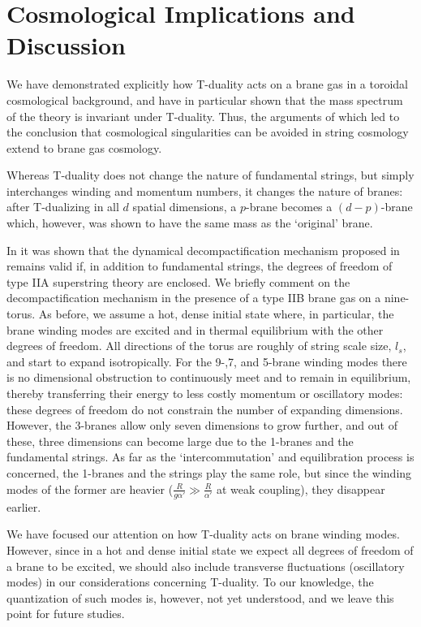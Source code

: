 \documentclass[a4paper,twocolumn,nofootinbib,tightenlines,prd,aps,
               superscriptaddress]{revtex4} %
\newcommand{\al}{\alpha}
\begin{document}
\section{Cosmological Implications and Discussion}
\label{sec:cosmology}

We have demonstrated explicitly how T-duality acts on a brane gas
in a toroidal cosmological background, and have in particular
shown that the mass spectrum of the theory is invariant under
T-duality. Thus, the arguments of \cite{Brandenberger:1989aj}
which led to the conclusion that cosmological singularities can be
avoided in string cosmology extend to brane gas cosmology.

Whereas T-duality does not change the nature of fundamental
strings, but simply interchanges winding and momentum numbers, it
changes the nature of branes: after T-dualizing in all $d$ spatial
dimensions, a $p$-brane becomes a $(d-p)$-brane which, however,
was shown to have the same mass as the `original' brane.

In \cite{Alexander:2000xv} it was shown that the dynamical
decompactification mechanism proposed in
\cite{Brandenberger:1989aj} remains valid if, in addition to
fundamental strings, the degrees of freedom of type IIA
superstring theory are enclosed. We briefly comment on the
decompactification mechanism in the presence of a type IIB brane
gas on a nine-torus. As before, we assume a hot, dense initial
state where, in particular, the brane winding modes are excited
and in thermal equilibrium with the other degrees of freedom. All
directions of the torus are roughly of string scale size, $l_s$,
and start to expand isotropically. For the 9-,7, and 5-brane
winding modes there is no dimensional obstruction to continuously
meet and to remain in equilibrium, thereby transferring their
energy to less costly momentum or oscillatory modes: these degrees
of freedom do not constrain the number of expanding dimensions.
However, the 3-branes allow only seven dimensions to grow further,
and out of these, three dimensions can become large due to the
1-branes and the fundamental strings. As far as the
`intercommutation' and equilibration process is concerned, the
1-branes and the strings play the same role, but since the winding
modes of the former are heavier ($\frac{R}{g\al'} \gg
\frac{R}{\al'}$ at weak coupling), they disappear earlier.

We have focused our attention on how T-duality acts on brane
winding modes. However, since in a hot and dense initial state we
expect all degrees of freedom of a brane to be excited, we should
also include transverse fluctuations (oscillatory modes) in our
considerations concerning T-duality. To our knowledge, the
quantization of such modes is, however, not yet understood, and we
leave this point for future studies.
\end{document}
